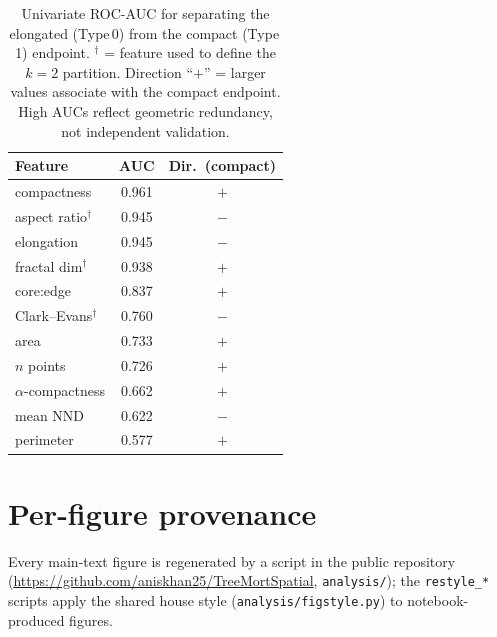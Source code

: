 \documentclass{article}
\begin{document}
\begin{table}[h]
\centering
\small
\begin{tabular}{@{}lcc@{}}
\toprule
\textbf{Feature} & \textbf{AUC} & \textbf{Dir.\ (compact)} \\
\midrule
compactness & 0.961 & $+$ \\
aspect ratio$^\dagger$ & 0.945 & $-$ \\
elongation & 0.945 & $-$ \\
fractal dim$^\dagger$ & 0.938 & $+$ \\
core:edge & 0.837 & $+$ \\
Clark--Evans$^\dagger$ & 0.760 & $-$ \\
area & 0.733 & $+$ \\
$n$ points & 0.726 & $+$ \\
$\alpha$-compactness & 0.662 & $+$ \\
mean NND & 0.622 & $-$ \\
perimeter & 0.577 & $+$ \\
\bottomrule
\end{tabular}
\caption{Univariate ROC-AUC for separating the elongated (Type\,0) from the compact (Type\,1)
endpoint. $^\dagger$ = feature used to define the $k=2$ partition. Direction ``$+$'' = larger values
associate with the compact endpoint. High AUCs reflect geometric redundancy, not independent
validation.}
\label{tab:si-auc}
\end{table}

\section{Per-figure provenance}
\label{si:prov}

Every main-text figure is regenerated by a script in the public repository
(\url{https://github.com/aniskhan25/TreeMortSpatial}, \texttt{analysis/}); the \texttt{restyle\_*}
scripts apply the shared house style (\texttt{analysis/figstyle.py}) to notebook-produced figures.
\end{document}
